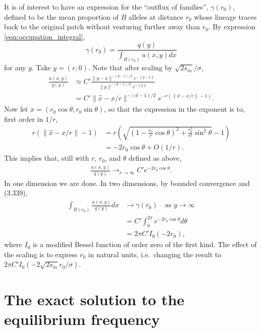 \documentclass{article}
\newcommand{\citet}[1]{\cite{#1}}
\begin{document}
It is of interest to have an expression for the ``outflux of families'',
$\gamma(r_0)$, 
defined to be the mean proportion of $B$ alleles at distance $r_0$
whose lineage traces back to the original patch without venturing further away than $r_0$.
By expression \eqref{eqn:occupation_integral},
\[
    \gamma(r_0) = \frac{q(y)}{\int_{B(r_0)} u(x,y) dx}
\]
for any $y$.  
Take $y=(r,0)$.
Note that after scaling by $\sqrt{2s_m}/\sigma$,
\begin{align}
    \frac{ u(x,y) }{ q(y) } &\simeq C' \frac{ \|y-x\|^{-(d-1)/2} e^{-\|y-x\|} }{ \|y\|^{-(d-1)/2} e^{-\|y\|} } \\
        &= C' \| \hat x - x/r \|^{-(d-1)/2} e^{-r (\|\hat x - x/r\| - 1)} .
\end{align}
Now let $x = (r_0 \cos \theta, r_0 \sin \theta)$,
so that the expression in the exponent is to, first order in $1/r$,
\begin{align}
    r (\|\hat x - x/r\| - 1) &= r \left( \sqrt{ \left( 1 - \frac{r_0}{r} \cos \theta \right)^2 + \frac{r_0^2}{r^2} \sin^2 \theta } - 1 \right ) \\
            &= - 2 r_0 \cos \theta + O(1/r) .
\end{align}
This implies that, still with $r$, $r_0$, and $\theta$ defined as above,
\begin{align}
    \frac{u(x,y)}{q(y)} \longrightarrow_{r \to \infty} C' e^{-2 r_0 \cos \theta} .
\end{align}
In one dimension we are done.
In two dimensions,
by bounded convergence and \citet{gradshteyn2007table} (3.339),
\begin{align}
  \int_{B(r_0)} \frac{u(x,y)}{q(y)} dx &\to \gamma(r_0) \quad \text{as } y \to \infty\\
            &= C' \int_0^{2 \pi} e^{-2 r_0 \cos \theta} d\theta \\
                         &= 2 \pi C' I_0(-2r_0),
\end{align}
where $I_0$ is a modified Bessel function of order zero of the first kind.
The effect of the scaling is to express $r_0$ in natural units, i.e.\ changing the result to $2 \pi C' I_0( - 2 \sqrt{2s_m} r_0 / \sigma ) $.






\appendix

\setcounter{secnumdepth}{2}

\section{The exact solution to the equilibrium frequency}
\label{apx:elliptic_integrals}
\end{document}
